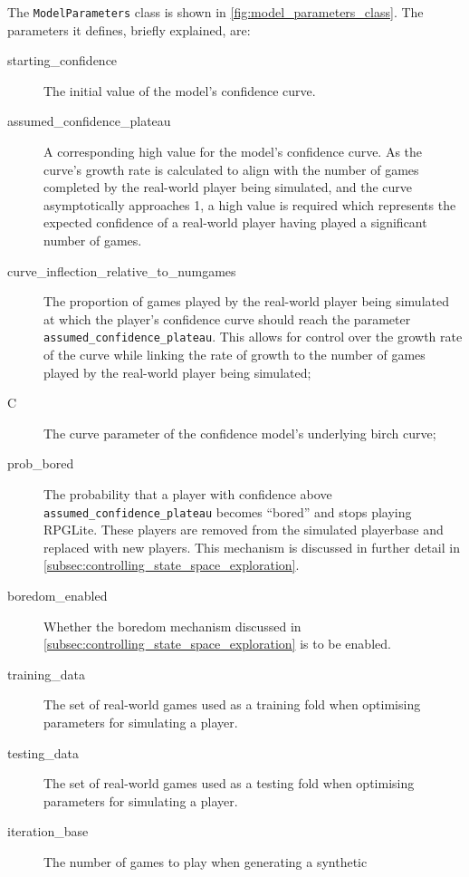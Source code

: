 The \lstinline{ModelParameters} class is shown in
\cref{fig:model_parameters_class}. The parameters it defines, briefly explained,
are:\label{list_of_model_parameter_attributes}

\begin{description}
  \item[starting\_confidence] The initial value of the model's confidence curve.
  \item[assumed\_confidence\_plateau] A corresponding high value for the model's
  confidence curve. As the curve's growth rate is calculated to align with the
  number of games completed by the real-world player being simulated, and the
  curve asymptotically approaches 1, a high value is required which represents
  the expected confidence of a real-world player having played a significant
  number of games.
  \item[curve\_inflection\_relative\_to\_numgames] The proportion of games played by
  the real-world player being simulated at which the player's confidence
  curve should reach the parameter \lstinline{assumed_confidence_plateau}. This
  allows for control over the growth rate of the curve while linking the rate of
  growth to the number of games played by the real-world player being simulated;
  \item[C] The curve parameter of the confidence model's underlying birch curve;
  \item[prob\_bored] The probability that a player with confidence above
  \lstinline{assumed_confidence_plateau} becomes ``bored'' and stops playing
  RPGLite. These players are removed from the simulated playerbase and replaced
  with new players. This mechanism is discussed in further detail in
  \cref{subsec:controlling_state_space_exploration}.
  \item[boredom\_enabled] Whether the boredom mechanism discussed in
  \cref{subsec:controlling_state_space_exploration} is to be enabled.
  \item[training\_data] The set of real-world games used as a training fold when
  optimising parameters for simulating a player.
  \item[testing\_data] The set of real-world games used as a testing fold when
  optimising parameters for simulating a player.
  \item[iteration\_base] The number of games to play when generating a synthetic

\end{description}
